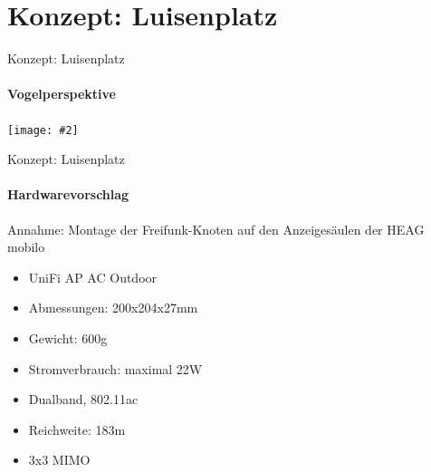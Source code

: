 \documentclass{beamer}
\newcommand{\centeredimage}[2][ ]{
        \begin{center}
            \texttt{[image: \#2]} $\;$

            \tiny{#1}
        \end{center}
}
\begin{document}
\section{Konzept: Luisenplatz}
\begin{frame}{Konzept: Luisenplatz}
\framesubtitle{Vogelperspektive}
\centeredimage{images/plan_luisenplatz1.jpg}
\end{frame}

\begin{frame}{Konzept: Luisenplatz}
\framesubtitle{Hardwarevorschlag}
Annahme: Montage der Freifunk-Knoten auf den Anzeigesäulen der HEAG mobilo


\begin{minipage}{0.4\textwidth} 
\begin{itemize}
	\item UniFi AP AC Outdoor
	\item Abmessungen: 200x204x27mm
	\item Gewicht: 600g
	\item Stromverbrauch: maximal 22W
	\item Dualband, 802.11ac
	\item Reichweite: 183m
	\item 3x3 MIMO
\end{itemize}
\end{minipage}
\hfill
\begin{minipage}{0.4\textwidth}

\end{minipage}
\end{frame}
\end{document}
